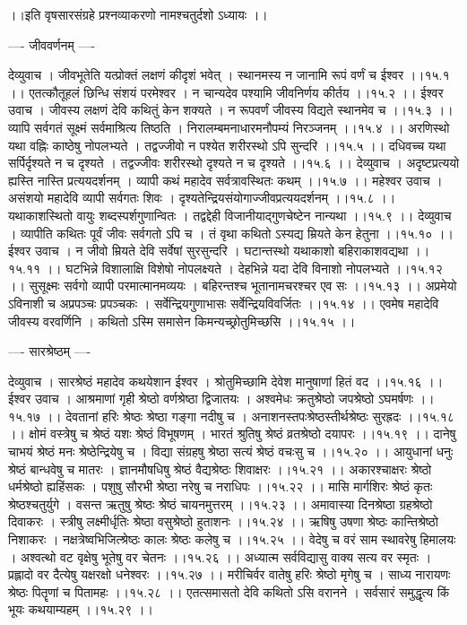 \documentclass[11pt]{book}
\begin{document}
\begin{landscape}
 ।।इति वृषसारसंग्रहे प्रश्नव्याकरणो नामश्चतुर्दशो ऽध्यायः ।।





---- जीववर्णनम् ----

देव्युवाच ।
जीवभूतेति यत्प्रोक्तं लक्षणं कीदृशं भवेत् ।
स्थानमस्य न जानामि रूपं वर्णं च ईश्वर ।।१५.१ ।।
एतत्कौतूहलं छिन्धि संशयं परमेश्वर ।
न चान्यदेव पश्यामि जीवनिर्णय कीर्तय ।।१५.२ ।।
ईश्वर उवाच ।
जीवस्य लक्षणं देवि कथितुं केन शक्यते ।
न रूपवर्णं जीवस्य विद्यते स्थानमेव च ।।१५.३ ।।
व्यापि सर्वगतं सूक्ष्मं सर्वमाश्रित्य तिष्ठति ।
निरालम्बमनाधारमनौपम्यं निरञ्जनम् ।।१५.४ ।।
अरणिस्थो यथा वह्निः काष्ठेषु नोपलभ्यते ।
तद्वज्जीवो न पश्येत शरीरस्थो ऽपि सुन्दरि ।।१५.५ ।।
दधिवच्च यथा सर्पिर्दृश्यते न च दृश्यते ।
तद्वज्जीवः शरीरस्थो दृश्यते न च दृश्यते ।।१५.६ ।।
देव्युवाच ।
अदृष्टप्रत्ययो ह्यस्ति नास्ति प्रत्ययदर्शनम् ।
व्यापी कथं महादेव सर्वत्रावस्थितः कथम् ।।१५.७ ।।
महेश्वर उवाच ।
असंशयो महादेवि व्यापी सर्वगतः शिवः ।
दृश्यतेन्द्रियसंयोगाज्जीवप्रत्ययदर्शनम् ।।१५.८ ।।
यथाकाशस्थितो वायुः शब्दस्पर्शगुणान्वितः ।
तद्वद्देही विजानीयाद्गुणचेष्टेन नान्यथा ।।१५.९ ।।
देव्युवाच ।
व्यापीति कथितः पूर्वं जीवः सर्वगतो ऽपि च ।
तं वृथा कथितो ऽस्यद्य म्रियते केन हेतुना ।।१५.१० ।।
ईश्वर उवाच ।
न जीवो म्रियते देवि सर्वेषां सुरसुन्दरि ।
घटान्तस्थो यथाकाशो बहिराकाशवद्यथा ।।१५.११ ।।
घटभिन्ने विशालाक्षि विशेषो नोपलक्ष्यते ।
देहभिन्ने यदा देवि विनाशो नोपलभ्यते ।।१५.१२ ।।
सुसूक्ष्मः सर्वगो व्यापी परमात्मानमव्ययः ।
बहिरन्तश्च भूतानामचरश्चर एव सः ।।१५.१३ ।।
अप्रमेयो ऽविनाशी च अप्रपञ्चः प्रपञ्चकः ।
सर्वेन्द्रियगुणाभासः सर्वेन्द्रियविवर्जितः ।।१५.१४ ।।
एवमेष महादेवि जीवस्य वरवर्णिनि ।
कथितो ऽस्मि समासेन किमन्यच्छ्रोतुमिच्छसि ।।१५.१५ ।।

---- सारश्रेष्ठम् ----

देव्युवाच ।
सारश्रेष्ठं महादेव कथयेशान ईश्वर ।
श्रोतुमिच्छामि देवेश मानुषाणां हितं वद ।।१५.१६ ।।
ईश्वर उवाच ।
आश्रमाणां गृही श्रेष्ठो वर्णश्रेष्ठा द्विजातयः ।
अश्वमेधः क्रतुश्रेष्ठो जपश्रेष्ठो ऽघमर्षणः ।।१५.१७ ।।
देवतानां हरिः श्रेष्ठः श्रेष्ठा गङ्गा नदीषु च ।
अनाशनस्तपःश्रेष्ठस्तीर्थश्रेष्ठः सुरह्रदः ।।१५.१८ ।।
क्षोमं वस्त्रेषु च श्रेष्ठं यशः श्रेष्ठं विभूषणम् ।
भारतं श्रुतिषु श्रेष्ठं व्रतश्रेष्ठो दयापरः ।।१५.१९ ।।
दानेषु चाभयं श्रेष्ठं मनः श्रेष्ठेन्द्रियेषु च ।
विद्या संग्रहषु श्रेष्ठा सत्यं श्रेष्ठं वचःसु च ।।१५.२० ।।
आयुधानां धनुः श्रेष्ठं बान्धवेषु च मातरः ।
ज्ञानमौषधिषु श्रेष्ठं वैद्यश्रेष्ठः शिवाक्षरः ।।१५.२१ ।।
अकारश्चाक्षरः श्रेष्ठो धर्मश्रेष्ठो ह्यहिंसकः ।
पशुषु सौरभी श्रेष्ठा नरेषु च नराधिपः ।।१५.२२ ।।
मासि मार्गशिरः श्रेष्ठं कृतः श्रेष्ठश्चतुर्युगे ।
वसन्त ऋतुषु श्रेष्ठः श्रेष्ठं चायनमुत्तरम् ।।१५.२३ ।।
अमावास्या दिनश्रेष्ठा ग्रहश्रेष्ठो दिवाकरः ।
स्त्रीषु लक्ष्मीर्धृतिः श्रेष्ठा वसुश्रेष्ठो हुताशनः ।।१५.२४ ।।
ऋषिषु उषणा श्रेष्ठः कान्तिश्रेष्ठो निशाकरः ।
नक्षत्रेष्वभिजित्श्रेष्ठः कालः श्रेष्ठः कलेषु च  ।।१५.२५ ।।
वेदेषु च वरं साम स्थावरेषु हिमालयः ।
अश्वत्थो वट वृक्षेषु भूतेषु वर चेतनः ।।१५.२६ ।।
अध्यात्म सर्वविद्यासु वाक्य सत्य वर स्मृतः ।
प्रह्लादो वर दैत्येषु यक्षरक्षो धनेश्वरः ।।१५.२७ ।।
मरीचिर्वर वातेषु हरिः श्रेष्ठो मृगेषु च ।
साध्य नारायणः श्रेष्ठः पितॄणां च पितामहः ।।१५.२८ ।।
एतत्समासतो देवि कथितो ऽसि वरानने ।
सर्वसारं समुद्धृत्य किं भूयः कथयाम्यहम् ।।१५.२९ ।।


\end{landscape}
\end{document}
